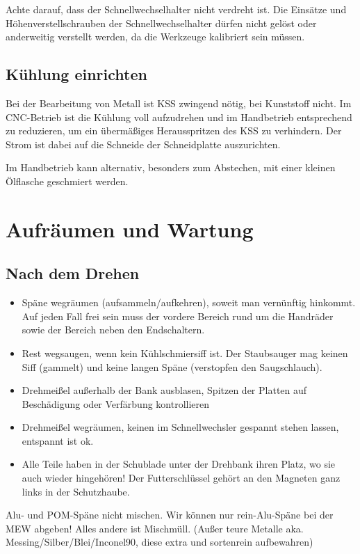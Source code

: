 \documentclass{\basedir/fablab-document}
\begin{document}
Achte darauf, dass der Schnellwechselhalter nicht verdreht ist. Die Einsätze und Höhenverstellschrauben der Schnellwechselhalter dürfen nicht gelöst oder anderweitig verstellt werden, da die Werkzeuge kalibriert sein müssen.

\subsection{Kühlung einrichten}

Bei der Bearbeitung von Metall ist KSS zwingend nötig, bei Kunststoff nicht.
Im CNC-Betrieb ist die Kühlung voll aufzudrehen und im Handbetrieb entsprechend zu reduzieren,
um ein übermäßiges Herausspritzen des KSS zu verhindern.
Der Strom ist dabei auf die Schneide der Schneidplatte auszurichten.

Im Handbetrieb kann alternativ, besonders zum Abstechen, mit einer kleinen Ölflasche geschmiert werden. 

\section{Aufräumen und Wartung}


\subsection{Nach dem Drehen}

\begin{itemize}
 \item Späne wegräumen (aufsammeln/aufkehren), soweit man vernünftig hinkommt. Auf jeden Fall frei sein muss der vordere Bereich rund um die Handräder sowie der Bereich neben den Endschaltern.
 \item Rest wegsaugen, wenn kein Kühlschmiersiff ist. Der Staubsauger mag keinen Siff (gammelt) und keine langen Späne (verstopfen den Saugschlauch).
 \item Drehmeißel außerhalb der Bank ausblasen, Spitzen der Platten auf Beschädigung oder Verfärbung kontrollieren
 \item Drehmeißel wegräumen, keinen im Schnellwechsler gespannt stehen lassen, entspannt ist ok.
 \item Alle Teile haben in der Schublade unter der Drehbank ihren Platz, wo sie auch wieder hingehören! Der Futterschlüssel gehört an den Magneten ganz links in der Schutzhaube.
\end{itemize}


Alu- und POM-Späne nicht mischen. Wir können nur rein-Alu-Späne bei der MEW abgeben! Alles andere ist Mischmüll. (Außer teure Metalle aka. Messing/Silber/Blei/Inconel90, diese extra und sortenrein aufbewahren)
\end{document}
